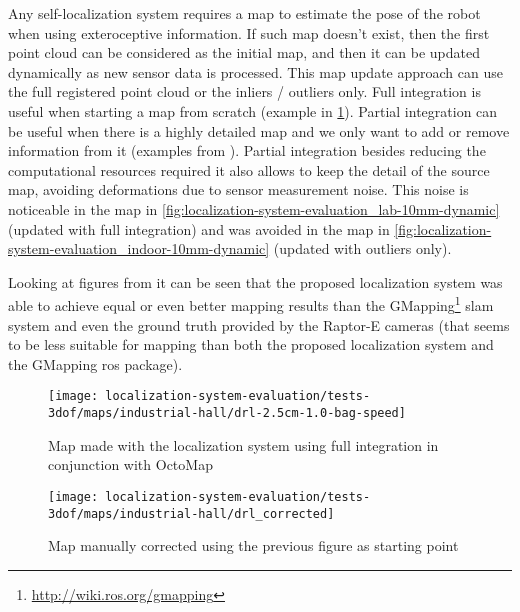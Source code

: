 Any self-localization system requires a map to estimate the pose of the robot when using exteroceptive information. If such map doesn't exist, then the first point cloud can be considered as the initial map, and then it can be updated dynamically as new sensor data is processed. This map update approach can use the full registered point cloud or the inliers / outliers only. Full integration is useful when starting a map from scratch (example in \cref{fig:localization-system-evaluation_drl-2.5cm-1.0-bag-speed}). Partial integration can be useful when there is a highly detailed map and we only want to add or remove information from it (examples from ). Partial integration besides reducing the computational resources required it also allows to keep the detail of the source map, avoiding deformations due to sensor measurement noise. This noise is noticeable in the map in \cref{fig:localization-system-evaluation_lab-10mm-dynamic} (updated with full integration) and was avoided in the map in \cref{fig:localization-system-evaluation_indoor-10mm-dynamic} (updated with outliers only).

Looking at figures from  it can be seen that the proposed localization system was able to achieve equal or even better mapping results than the GMapping\footnote{\url{http://wiki.ros.org/gmapping}} \gls{slam} system and even the ground truth provided by the Raptor-E cameras (that seems to be less suitable for mapping than both the proposed localization system and the GMapping \gls{ros} package).


\begin{figure}[H]
	\centering
	\texttt{[image: localization-system-evaluation/tests-3dof/maps/industrial-hall/drl-2.5cm-1.0-bag-speed]}
	\caption{Map made with the localization system using full integration in conjunction with OctoMap}
	\label{fig:localization-system-evaluation_drl-2.5cm-1.0-bag-speed}
\end{figure}

\begin{figure}[H]
	\centering
	\texttt{[image: localization-system-evaluation/tests-3dof/maps/industrial-hall/drl\_corrected]}
	\caption{Map manually corrected using the previous figure as starting point}
	\label{fig:localization-system-evaluation_drl_corrected}
\end{figure}

